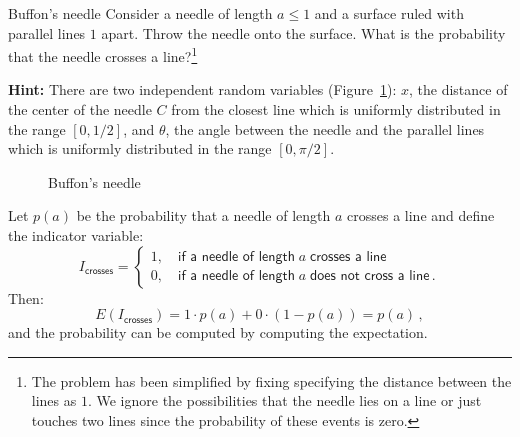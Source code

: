 \begin{prob}{Buffon's needle}
Consider a needle of length $a\leq 1$ and a surface ruled with parallel lines $1$ apart. Throw the needle onto the surface. What is the probability that the needle crosses a line?\footnote{The problem has been simplified by fixing specifying the distance between the lines as $1$. We ignore the possibilities that the needle lies on a line or just touches two lines since the probability of these events is zero.}

\textbf{Hint:} There are two independent random variables (Figure~\ref{f.buffon1}): $x$, the distance of the center of the needle $C$ from the closest line which is uniformly distributed in the range $[0,1/2]$, and $\theta$, the angle between the needle and the parallel lines which is uniformly distributed in the range $[0,\pi/2]$.

\begin{figure}[tb]
\begin{center}
\end{center}
\caption{Buffon's needle}\label{f.buffon1}
\end{figure}
\end{prob}


Let $p(a)$ be the probability that a needle of length $a$ crosses a line and define the indicator variable:
\[
I_{\textsf{crosses}}=
\left\{
\begin{array}{ll}
1,\quad \textsf{if a needle of length}\;a\;\textsf{crosses a line}\\
0, \quad \textsf{if a needle of length}\;a\;\textsf{does not cross a line}\,.
\end{array}
\right.
\]
Then:
\begin{equation}\label{eq.buffon-probability}
E(I_{\textsf{crosses}})=1\cdot p(a) + 0\cdot (1-p(a))=p(a)\,,
\end{equation}
and the probability can be computed by computing the expectation.

